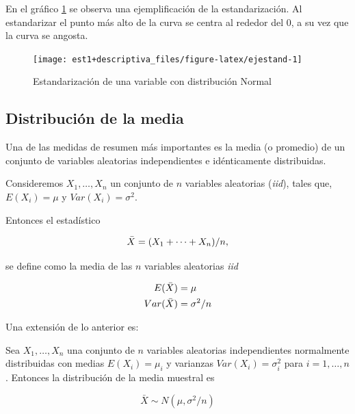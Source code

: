 \documentclass[
  11pt,
]{book}
\theoremstyle{definition}
\theoremstyle{definition}
\theoremstyle{definition}
\theoremstyle{definition}
\theoremstyle{remark}
\begin{document}
En el gráfico \ref{fig:ejestand} se observa una ejemplificación de la estandarización. Al estandarizar el punto más alto de la curva se centra al rededor del 0, a su vez que la curva se angosta.

\begin{figure}

{\centering \texttt{[image: est1+descriptiva\_files/figure-latex/ejestand-1]} 

}

\caption{Estandarización de una variable con distribución Normal}\label{fig:ejestand}
\end{figure}

\subsection{Distribución de la media}\label{distribuciuxf3n-de-la-media}

Una de las medidas de resumen más importantes es la media (o promedio) de un conjunto de variables aleatorias independientes e idénticamente distribuidas.

Consideremos \(X_1, \ldots , X_n\) un conjunto de \(n\) variables aleatorias (\emph{iid}), tales que, \(E(X_i) = \mu\) y \(Var(X_i) = \sigma^2\).

Entonces el estadístico

\begin{equation}
\notag
\bar{X} = (X_1 + \cdots + X_n)/n,
\end{equation}

se define como la media de las \(n\) variables aleatorias \emph{iid}

\begin{equation}
\notag
\begin{split}
E(\bar{X}) &= \mu\\
Var(\bar{X}) &= \sigma^2/n
\end{split}
\end{equation}

Una extensión de lo anterior es:

Sea \(X_1, \ldots , X_n\) una conjunto de \(n\) variables aleatorias independientes normalmente distribuidas con medias \(E(X_i) = \mu_i\) y varianzas \(Var(X_i) = \sigma_i^2\) para \(i=1,\ldots,n\). Entonces la distribución de la media muestral es

\begin{equation}
\bar{X}\sim N(\mu,\sigma^2/n)
\label{eq:distMedia}
\end{equation}
\end{document}
